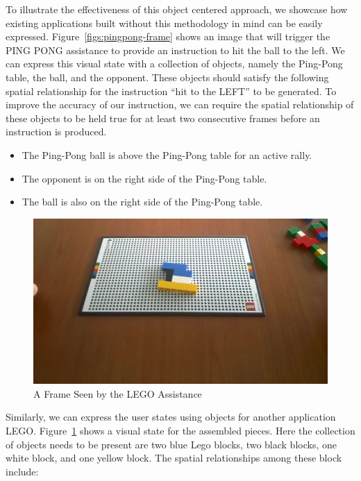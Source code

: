 To illustrate the effectiveness of this object centered approach, we showcase
how existing applications built without this methodology in mind can be easily
expressed. Figure~\ref{figs:pingpong-frame} shows an image that will trigger the
PING PONG assistance to provide an instruction to hit the ball to the left. We
can express this visual state with a collection of objects, namely the Ping-Pong
table, the ball, and the opponent. These objects should satisfy the following
spatial relationship for the instruction ``hit to the LEFT'' to be generated. To
improve the accuracy of our instruction, we can require the spatial relationship
of these objects to be held true for at least two consecutive frames before an
instruction is produced.

\begin{itemize}
  \item The Ping-Pong ball is above the Ping-Pong table for an active rally.
  \item The opponent is on the right side of the Ping-Pong table.
  \item The ball is also on the right side of the Ping-Pong table.
\end{itemize}

\begin{figure}
  \centering
  \includegraphics[trim={0 0 0 0},width=.9\linewidth]{FIGS/lego}
	\caption{A Frame Seen by the LEGO Assistance}
    \label{fig:lego-image}
\end{figure}

Similarly, we can express the user states using objects for another
application LEGO. Figure~\ref{fig:lego-image} shows a visual state for the
assembled pieces. Here the collection of objects needs to be present are two
blue Lego blocks, two black blocks, one white block, and one yellow block. The
spatial relationships among these block include:

